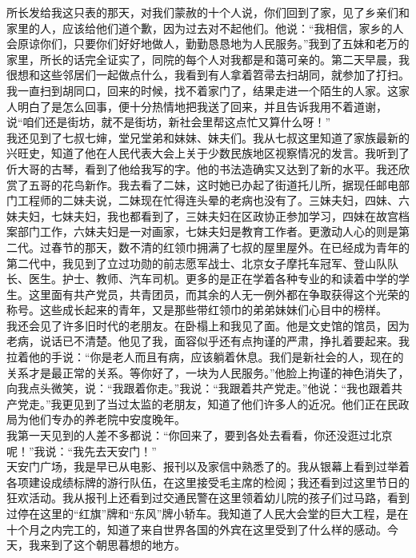所长发给我这只表的那天，对我们蒙赦的十个人说，你们回到了家，见了乡亲们和家里的人，应该给他们道个歉，因为过去对不起他们。他说：“我相信，家乡的人会原谅你们，只要你们好好地做人，勤勤恳恳地为人民服务。”我到了五妹和老万的家里，所长的话完全证实了，同院的每个人对我都是和蔼可亲的。第二天早晨，我很想和这些邻居们一起做点什么，我看到有人拿着笤帚去扫胡同，就参加了打扫。我一直扫到胡同口，回来的时候，找不着家门了，结果走进一个陌生的人家。这家人明白了是怎么回事，便十分热情地把我送了回来，并且告诉我用不着道谢，说“咱们还是街坊，就不是街坊，新社会里帮这点忙又算什么呀！”\\

我还见到了七叔七婶，堂兄堂弟和妹妹、妹夫们。我从七叔这里知道了家族最新的兴旺史，知道了他在人民代表大会上关于少数民族地区视察情况的发言。我听到了伒大哥的古琴，看到了他给我写的字。他的书法造确实又达到了新的水平。我还欣赏了五哥的花鸟新作。我去看了二妹，这时她已办起了街道托儿所，据现任邮电部门工程师的二妹夫说，二妹现在忙得连头晕的老病也没有了。三妹夫妇，四妹、六妹夫妇，七妹夫妇，我也都看到了，三妹夫妇在区政协正参加学习，四妹在故宫档案部门工作，六妹夫妇是一对画家，七妹夫妇是教育工作者。更激动人心的则是第二代。过春节的那天，数不清的红领巾拥满了七叔的屋里屋外。在已经成为青年的第二代中，我见到了立过功勋的前志愿军战士、北京女子摩托车冠军、登山队队长、医生。护士、教师、汽车司机。更多的是正在学着各种专业的和读着中学的学生。这里面有共产党员，共青团员，而其余的人无一例外都在争取获得这个光荣的称号。这些成长起来的青年，又是那些带红领巾的弟弟妹妹们心目中的榜样。\\

我还会见了许多旧时代的老朋友。在卧榻上和我见了面。他是文史馆的馆员，因为老病，说话已不清楚。他见了我，面容似乎还有点拘谨的严肃，挣扎着要起来。我拉着他的手说：“你是老人而且有病，应该躺着休息。我们是新社会的人，现在的关系才是最正常的关系。等你好了，一块为人民服务。”他脸上拘谨的神色消失了，向我点头微笑，说：“我跟着你走。”我说：“我跟着共产党走。”他说：“我也跟着共产党走。”我更见到了当过太监的老朋友，知道了他们许多人的近况。他们正在民政局为他们专办的养老院中安度晚年。\\

我第一天见到的人差不多都说：“你回来了，要到各处去看看，你还没逛过北京呢！”我说：“我先去天安门！”\\

天安门广场，我是早已从电影、报刊以及家信中熟悉了的。我从银幕上看到过举着各项建设成绩标牌的游行队伍，在这里接受毛主席的检阅；我还看到过这里节日的狂欢活动。我从报刊上还看到过交通民警在这里领着幼儿院的孩子们过马路，看到过停在这里的“红旗”牌和“东风”牌小轿车。我知道了人民大会堂的巨大工程，是在十个月之内完工的，知道了来自世界各国的外宾在这里受到了什么样的感动。今天，我来到了这个朝思暮想的地方。\\

